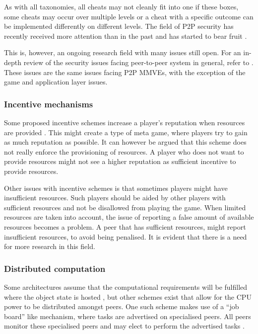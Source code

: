 As with all taxonomies, all cheats may not cleanly fit into one if these boxes, some cheats may occur over multiple levels or a cheat with a specific outcome can be implemented differently on different levels. The field of P2P security has recently received more attention than in the past and has started to bear fruit \cite{survey_p2p_game_cheats}.

This is, however, an ongoing research field with many issues still open. For an in-depth review of the security issues facing peer-to-peer system in general, refer to \cite{p2p_security_issues}. These issues are the same issues facing P2P MMVEs, with the exception of the game and application layer issues.

\subsubsection{Incentive mechanisms}

Some proposed incentive schemes increase a player's reputation when resources are provided  \cite{classic_p2p_reputation} \cite{proactive_reputation}. This might create a type of meta game, where players try to gain as much reputation as possible. It can however be argued that this scheme does not really enforce the provisioning of resources. A player who does not want to provide resources might not see a higher reputation as sufficient incentive to provide resources.

Other issues with incentive schemes is that sometimes players might have insufficient resources. Such players should be aided by other players with sufficient resources and not be disallowed from playing the game. When limited resources are taken into account, the issue of reporting a false amount of available resources becomes a problem. A peer that has sufficient resources, might report insufficient resources, to avoid being penalised. It is evident that there is a need for more research in this field.

\subsubsection{Distributed computation}

Some architectures assume that the computational requirements will be fulfilled where the object state is hosted \cite{solipsis}, but other schemes exist that allow for the CPU power to be distributed amongst peers. One such scheme makes use of a ``job board'' like mechanism, where tasks are advertised on specialised peers. All peers monitor these specialised peers and may elect to perform the advertised tasks \cite{fan_mediator_paper}.

